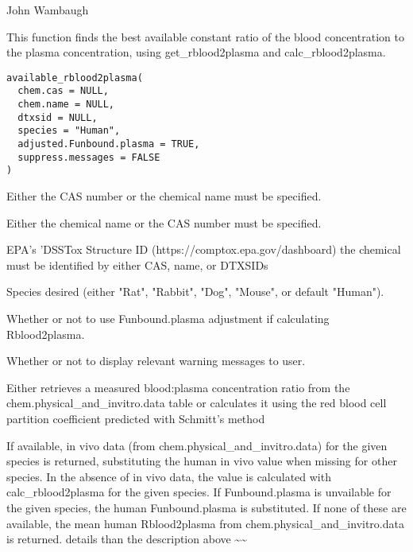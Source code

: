 \documentclass[a4paper]{book}
\begin{document}
%
\begin{Author}\relax
John Wambaugh
\end{Author}
%
\begin{Description}\relax
This function finds the best available constant ratio of the blood
concentration to the plasma concentration, using get\_rblood2plasma and
calc\_rblood2plasma.
\end{Description}
%
\begin{Usage}
\begin{verbatim}
available_rblood2plasma(
  chem.cas = NULL,
  chem.name = NULL,
  dtxsid = NULL,
  species = "Human",
  adjusted.Funbound.plasma = TRUE,
  suppress.messages = FALSE
)
\end{verbatim}
\end{Usage}
%
\begin{Arguments}
\begin{ldescription}
\item[\code{chem.cas}] Either the CAS number or the chemical name must be
specified.

\item[\code{chem.name}] Either the chemical name or the CAS number must be
specified.

\item[\code{dtxsid}] EPA's 'DSSTox Structure ID (https://comptox.epa.gov/dashboard)
the chemical must be identified by either CAS, name, or DTXSIDs

\item[\code{species}] Species desired (either "Rat", "Rabbit", "Dog", "Mouse", or
default "Human").

\item[\code{adjusted.Funbound.plasma}] Whether or not to use Funbound.plasma
adjustment if calculating Rblood2plasma.

\item[\code{suppress.messages}] Whether or not to display relevant warning messages
to user.
\end{ldescription}
\end{Arguments}
%
\begin{Details}\relax
Either retrieves a measured blood:plasma concentration ratio from the
chem.physical\_and\_invitro.data table or calculates it using the red blood cell
partition coefficient predicted with Schmitt's method

If available, in vivo data (from chem.physical\_and\_invitro.data) for the
given species is returned, substituting the human in vivo value when missing
for other species.  In the absence of in vivo data, the value is calculated
with calc\_rblood2plasma for the given species. If Funbound.plasma is
unvailable for the given species, the human Funbound.plasma is substituted.
If none of these are available, the mean human Rblood2plasma from
chem.physical\_and\_invitro.data is returned.  
details than the description above \textasciitilde{}\textasciitilde{}
\end{Details}
\end{document}
